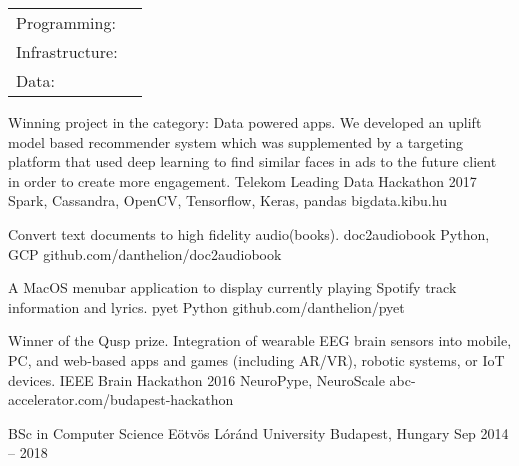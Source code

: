 \documentclass[]{awesome-cv}
\begin{document}
\begin{cventries}
	\cventry
	{}
	{\def\arraystretch{1.15}{\begin{tabular}{ l l }
		Programming:  & {\skill{ Python (pandas, airflow, luigi, scikit, etc.), SQL, bash, Go, HTML/JS/CSS3 }} \\
		Infrastructure:  & {\skill{ Docker, Kubernetes, CI/CD, Google Cloud Platform, GNU/Linux }} \\
		Data: & {\skill{ Data modeling, ETL processes, database schema design, object storages }} \\
		\end{tabular}}}
	{}
	{}
	{}
\end{cventries}

\vspace{-7mm}
\begin{cventries}
	\cventry
	{Winning project in the category: Data powered apps. We developed an uplift model based recommender system which was supplemented by a targeting platform that used deep learning to find similar faces in ads to the future client in order to create more engagement.}
	{Telekom Leading Data Hackathon 2017}
	{Spark, Cassandra, OpenCV, Tensorflow, Keras, pandas}
	{bigdata.kibu.hu}
	{}
	
	\vspace{-5mm}
	\cventry
	{Convert text documents to high fidelity audio(books).}
	{doc2audiobook}
	{Python, GCP}
	{github.com/danthelion/doc2audiobook}
	{}
	
	\vspace{-5mm}
	\cventry
	{A MacOS menubar application to display currently playing Spotify track information and lyrics.}
	{pyet}
	{Python}
	{github.com/danthelion/pyet}
	{}
	
	\vspace{-5mm}
	\cventry
	{Winner of the Qusp prize. Integration of wearable EEG brain sensors into mobile, PC, and web-based apps and games (including AR/VR), robotic systems, or IoT devices.}
	{IEEE Brain Hackathon 2016}
	{NeuroPype, NeuroScale}
	{abc-accelerator.com/budapest-hackathon}
	{}
	
	\vspace{-5mm}
\end{cventries}

\begin{cventries}
	\cventry
	{BSc in Computer Science}
	{Eötvös Lóránd University}
	{Budapest, Hungary}
	{Sep 2014 – 2018}
	{}
\end{cventries}

\vspace{-2mm}
\ 
\end{document}
